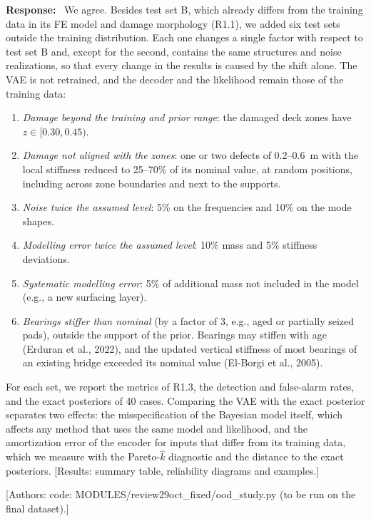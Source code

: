 \documentclass[11pt]{article}
\newenvironment{response}{\par\smallskip\noindent\color{resp}\textbf{Response:}\ }{\par}
\newcommand{\authornote}[1]{\textcolor{note}{\textsf{[Authors: #1]}}}
\newcommand{\tbd}[1]{\textcolor{note}{\textsf{[#1]}}}
\begin{document}
\begin{response}
We agree. Besides test set B, which already differs from the training data in its FE model and damage morphology (R1.1),
we added six test sets outside the training distribution. Each one changes a single factor with respect to test set B
and, except for the second, contains the same structures and noise realizations, so that every change in the results is
caused by the shift alone. The VAE is not retrained, and the decoder and the likelihood remain those of the training
data:
\begin{enumerate}[leftmargin=*]
\item \emph{Damage beyond the training and prior range}: the damaged deck zones have $z\in[0.30,0.45)$.
\item \emph{Damage not aligned with the zones}: one or two defects of 0.2--0.6~m with the local stiffness reduced to
25--70\% of its nominal value, at random positions, including across zone boundaries and next to the supports.
\item \emph{Noise twice the assumed level}: 5\% on the frequencies and 10\% on the mode shapes.
\item \emph{Modelling error twice the assumed level}: 10\% mass and 5\% stiffness deviations.
\item \emph{Systematic modelling error}: 5\% of additional mass not included in the model (e.g., a new surfacing layer).
\item \emph{Bearings stiffer than nominal} (by a factor of 3, e.g., aged or partially seized pads), outside the support of
the prior. Bearings may stiffen with age (Erduran et al., 2022), and the updated vertical stiffness of most bearings of
an existing bridge exceeded its nominal value (El-Borgi et al., 2005).
\end{enumerate}
For each set, we report the metrics of R1.3, the detection and false-alarm rates, and the exact posteriors of 40 cases.
Comparing the VAE with the exact posterior separates two effects: the misspecification of the Bayesian model itself,
which affects any method that uses the same model and likelihood, and the amortization error of the encoder for inputs
that differ from its training data, which we measure with the Pareto-$\hat{k}$ diagnostic and the distance to the exact
posteriors.
\tbd{Results: summary table, reliability diagrams and examples.}
\end{response}
\authornote{code: MODULES/review29oct\_fixed/ood\_study.py (to be run on the final dataset).}
\end{document}
